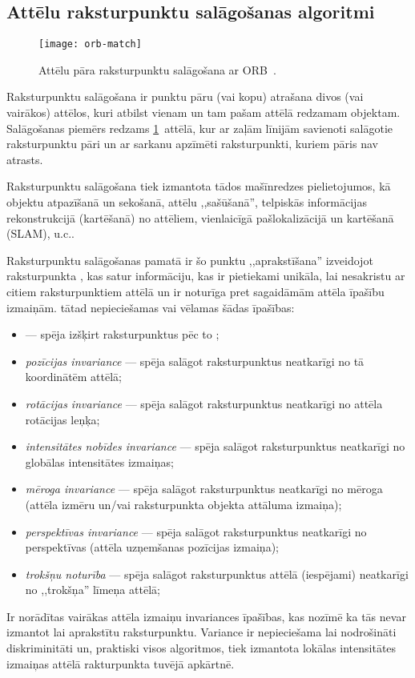 \subsection{Attēlu raksturpunktu salāgošanas algoritmi} \label{sec:matching}
\begin{figure}[tbh]
	\centering
	\texttt{[image: orb-match]}
	\caption{Attēlu pāra raksturpunktu salāgošana ar ORB~\cite{ORB}.}
	\label{fig:orb}
\end{figure}

Raksturpunktu salāgošana ir punktu pāru (vai kopu) atrašana divos
(vai vairākos) attēlos, kuri atbilst vienam un tam pašam attēlā redzamam
objektam. Salāgošanas piemērs redzams \ref{fig:orb}~attēlā, kur ar zaļām līnijām
savienoti salāgotie raksturpunktu pāri un ar sarkanu apzīmēti raksturpunkti,
kuriem pāris nav atrasts.

Raksturpunktu salāgošana tiek izmantota tādos mašīnredzes pielietojumos, kā
objektu atpazīšanā un sekošanā, attēlu ,,sašūšanā'', 
telpiskās informācijas rekonstrukcijā (kartēšanā) no attēliem,
vienlaicīgā pašlokalizācijā un kartēšanā (SLAM), u.c..

Raksturpunktu salāgošanas pamatā ir šo punktu ,,aprakstīšana'' izveidojot
raksturpunkta , kas satur informāciju,
kas ir pietiekami unikāla, lai nesakristu ar citiem raksturpunktiem attēlā
un ir noturīga pret sagaidāmām attēla īpašību izmaiņām.
 tātad nepieciešamas vai vēlamas šādas īpašības:
\begin{itemize}
	\item {} --- spēja izšķirt raksturpunktus
		pēc to ;
	\item \emph{pozīcijas invariance} --- spēja salāgot raksturpunktus
		neatkarīgi no tā koordinātēm attēlā;
	\item \emph{rotācijas invariance} --- spēja salāgot raksturpunktus
		neatkarīgi no attēla rotācijas leņķa;
	\item \emph{intensitātes nobīdes invariance} --- spēja salāgot raksturpunktus
		neatkarīgi no globālas intensitātes izmaiņas;
	\item \emph{mēroga invariance} --- spēja salāgot raksturpunktus
		neatkarīgi no mēroga (attēla izmēru un/vai raksturpunkta objekta attāluma izmaiņa);
	\item \emph{perspektīvas invariance} --- spēja salāgot raksturpunktus
		neatkarīgi no perspektīvas (attēla uzņemšanas pozīcijas izmaiņa);
	\item \emph{trokšņu noturība} --- spēja salāgot raksturpunktus
		attēlā (iespējami) neatkarīgi no ,,trokšņa'' līmeņa attēlā;
\end{itemize}
Ir norādītas vairākas attēla izmaiņu invariances īpašības,
kas nozīmē ka tās nevar izmantot lai aprakstītu raksturpunktu.
Variance ir nepieciešama lai nodrošināti diskriminitāti un, praktiski visos
algoritmos, tiek izmantota lokālas intensitātes izmaiņas attēlā 
rakturpunkta tuvējā apkārtnē.

